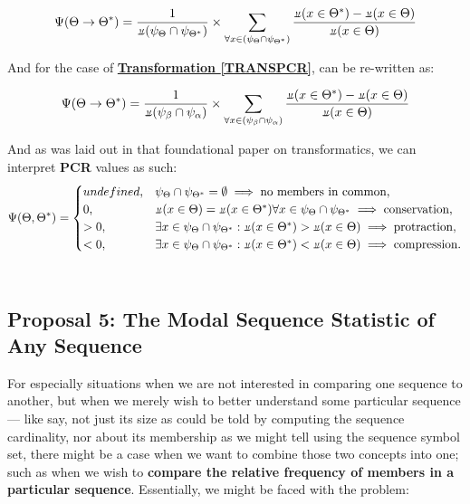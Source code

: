 \documentclass[12pt,a4paper]{article}
\newcommand{\invpi}[1]{\mathop{\rotatebox[origin=c]{180}{$\pi$}}#1}
\begin{document}
\begin{equation}
\label{EQPCR}
\Psi(\Theta \rightarrow \Theta^*) = \frac{1}{\invpi(\psi_\Theta \cap \psi_{\Theta^*})} \times \sum\limits_{\forall x \in (\psi_\Theta \cap \psi_{\Theta^*})} \frac{\invpi(x \in \Theta^*) - \invpi(x \in \Theta)}{\invpi(x \in \Theta)}
\end{equation}

And for the case of \textbf{\hyperref[TRANSPCR]{Transformation \ref{TRANSPCR}}}, can be re-written as:

\begin{equation}
\label{EQPCR2}
\Psi(\Theta \rightarrow \Theta^*) = \frac{1}{\invpi(\psi_\beta \cap \psi_\alpha)} \times \sum\limits_{\forall x \in (\psi_\beta \cap \psi_\alpha)} \frac{\invpi(x \in \Theta^*) - \invpi(x \in \Theta)}{\invpi(x \in \Theta)}
\end{equation}

And as was laid out in that foundational paper on transformatics\cite{transformatics}, we can interpret \textbf{PCR} values as such:\\


\begin{equation}
\label{EQPCRCASES}
\Psi(\Theta,\Theta^*) = \begin{cases}
undefined, & \psi_\Theta \cap \psi_{\Theta^*} = \emptyset \implies \text{no members in common},\\
0, & \invpi(x \in \Theta) = \invpi(x \in \Theta^*) \forall x \in \psi_\Theta \cap \psi_{\Theta^*} \implies \text{conservation},\\
> 0, & \exists x \in \psi_\Theta \cap \psi_{\Theta^*}: \invpi(x \in \Theta^*) > \invpi(x \in \Theta) \implies \text{protraction},\\
< 0, & \exists x \in \psi_\Theta \cap \psi_{\Theta^*}: \invpi(x \in \Theta^*) < \invpi(x \in \Theta) \implies \text{compression}.
\end{cases}
\end{equation}\\


\subsection{Proposal 5: The Modal Sequence Statistic of Any Sequence\cite{transformatics}}
\label{PROP5}


For especially situations when we are not interested in comparing one sequence to another, but when we merely wish to better understand some particular sequence --- like say, not just its size as could be told by computing the sequence cardinality, nor about its membership as we might tell using the sequence symbol set, there might be a case when we want to combine those two concepts into one; such as when we wish to \textbf{compare the relative frequency of members in a particular sequence}. Essentially, we might be faced with the problem:\\
\end{document}
